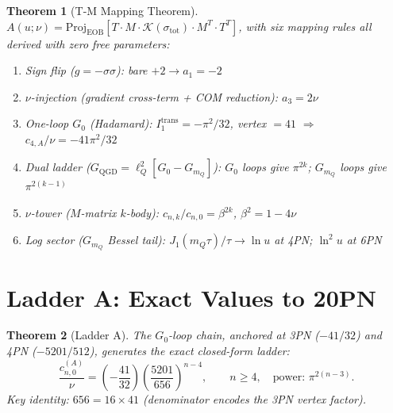 \documentclass[11pt,a4paper]{article}
\theoremstyle{plain}
\newtheorem{theorem}{Theorem}[section]
\theoremstyle{definition}
\theoremstyle{remark}
\newcommand{\lQ}{\ell_Q}
\newcommand{\mQ}{m_Q}
\newcommand{\cA}{c^{(A)}}
\begin{document}
\begin{theorem}[T-M Mapping Theorem]\label{thm:TM}
$A(u;\nu) = \mathrm{Proj}_{\mathrm{EOB}}[T \cdot M \cdot \mathcal{K}(\sigma_{\mathrm{tot}}) \cdot M^T \cdot T^T]$,
with six mapping rules all derived with zero free parameters:
\begin{enumerate}[label=\rm(R\arabic*),noitemsep]
  \item Sign flip ($g=-\sigma\sigma$): bare $+2 \to a_1=-2$
  \item $\nu$-injection (gradient cross-term + COM reduction): $a_3=2\nu$
  \item One-loop $G_0$ (Hadamard): $I_1^{\mathrm{trans}}=-\pi^2/32$,
    vertex $=41$ $\Rightarrow$ $c_{4,A}/\nu=-41\pi^2/32$
  \item Dual ladder ($G_{\mathrm{QGD}}=\lQ^2[G_0{-}G_{\mQ}]$):
    $G_0$ loops give $\pi^{2k}$; $G_{\mQ}$ loops give $\pi^{2(k-1)}$
  \item $\nu$-tower ($M$-matrix $k$-body): $c_{n,k}/c_{n,0}=\beta^{2k}$,
    $\beta^2=1-4\nu$
  \item Log sector ($G_{\mQ}$ Bessel tail): $J_1(m_Q\tau)/\tau \to \ln u$
    at 4PN; $\ln^2 u$ at 6PN
\end{enumerate}
\end{theorem}

\section{Ladder A: Exact Values to 20PN}
\label{sec:ladderA}

\begin{theorem}[Ladder A]\label{thm:LA}
The $G_0$-loop chain, anchored at 3PN ($-41/32$) and 4PN ($-5201/512$),
generates the exact closed-form ladder:
\begin{equation}
  \frac{\cA_{n,0}}{\nu} = \left(-\frac{41}{32}\right)
    \left(\frac{5201}{656}\right)^{\!n-4}, \qquad n\geq4,
    \quad \text{power: }\pi^{2(n-3)}.
  \label{eq:LA}
\end{equation}
Key identity: $656 = 16\times41$ (denominator encodes the 3PN vertex factor).
\end{theorem}
\end{document}
